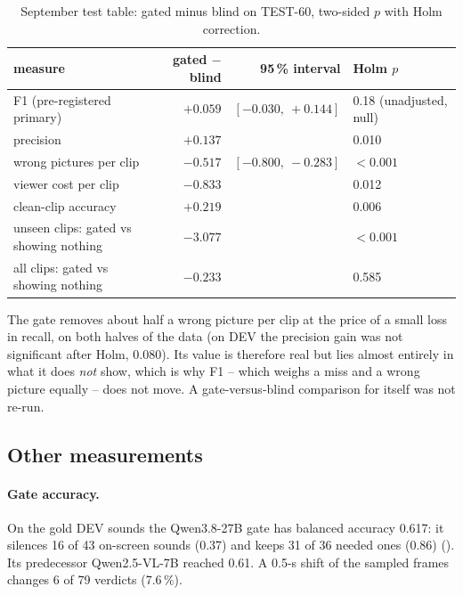 \begin{table}[h]
\centering\small
\caption{September test table: gated minus blind on TEST-60, two-sided $p$ with Holm correction.}
\label{tab:sept}
\begin{tabular}{lrrl}
\toprule
measure & gated $-$ blind & 95\,\% interval & Holm $p$ \\
\midrule
F1 (pre-registered primary) & $+0.059$ & $[-0.030,\ +0.144]$ & 0.18 (unadjusted, null) \\
precision & $+0.137$ & & 0.010 \\
wrong pictures per clip & $-0.517$ & $[-0.800,\ -0.283]$ & $<0.001$ \\
viewer cost per clip & $-0.833$ & & 0.012 \\
clean-clip accuracy & $+0.219$ & & 0.006 \\
\midrule
unseen clips: gated vs showing nothing & $-3.077$ & & $<0.001$ \\
all clips: gated vs showing nothing & $-0.233$ & & 0.585 \\
\bottomrule
\end{tabular}
\end{table}

The gate removes about half a wrong picture per clip at the price of a small loss in recall, on both halves of the
data (on DEV the precision gain was not significant after Holm, 0.080). Its value is therefore real but lies almost
entirely in what it does \emph{not} show, which is why F1 -- which weighs a miss and a wrong picture equally -- does not
move. A gate-versus-blind comparison for \Dp{} itself was not re-run.

\subsection{Other measurements}\label{sec:other-results}
\paragraph{Gate accuracy.} On the gold DEV sounds the Qwen3.8-27B gate has balanced accuracy 0.617: it silences 16 of
43 on-screen sounds (0.37) and keeps 31 of 36 needed ones (0.86) ().
Its predecessor Qwen2.5-VL-7B reached 0.61. A 0.5-s shift of the sampled frames changes 6 of 79 verdicts (7.6\,\%).

